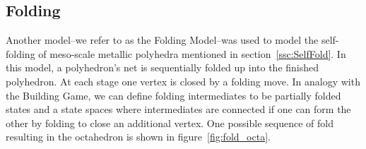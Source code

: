 %
%
%
%
%
%
%
%
%
%
\subsection{Folding}
Another model--we refer to as the Folding Model--was used to model the self-folding of meso-scale metallic polyhedra mentioned in section~\ref{ssc:SelfFold}. In this model, a polyhedron's net is sequentially folded up into the finished polyhedron. At each stage one vertex is closed by a folding move. In analogy with the Building Game, we can define folding intermediates to be partially folded states and a state spaces where intermediates are connected if one can form the other by folding to close an additional vertex. One possible sequence of fold resulting in the octahedron is shown in figure~\ref{fig:fold_octa}. 

